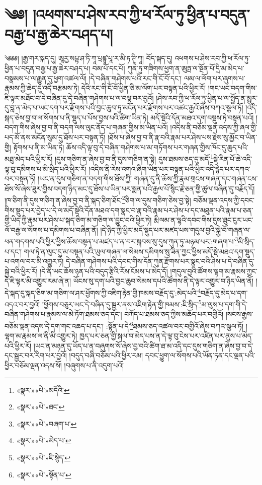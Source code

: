 \chapter{༄༅། །འཕགས་པ་ཤེས་རབ་ཀྱི་ཕ་རོལ་ཏུ་ཕྱིན་པ་བདུན་བརྒྱ་པ་རྒྱ་ཆེར་བཤད་པ།}༄༅༅། །རྒྱ་གར་སྐད་དུ། ཨཱརྱ་སཔྟ་ཤ་ཏི་ཀཱ་པྲཛྙཱ་པཱ་ར་མི་ཏ་ཊཱི་ཀཱ། བོད་སྐད་དུ། འཕགས་པ་ཤེས་རབ་ཀྱི་ཕ་རོལ་ཏུ་ཕྱིན་པ་བདུན་བརྒྱ་པ་རྒྱ་ཆེར་བཤད་པ། བམ་པོ་དང་པོ། ཀུན་ཏུ་གཟིགས་ཕྱག་ན་ཨུཏྤ་ལ་སྔོན་པོ་དྲི་མ་མེད་པ་བསྣམས་པ་ལ་རྒྱུན་དུ་ཕྱག་འཚལ་ལོ། །དེ་བཞིན་གཤེགས་པའི་རང་གི་ངོ་བོ་དང་། ལམ་ལ་ལོག་པར་ཞུགས་པ་རྣམས་ཀྱི་ཆེད་དུ་འདི་བརྩམས་ཏེ། དེའི་རང་གི་ངོ་བོ་ཕྱིན་ཅི་མ་ལོག་པར་བསྟན་པའི་ཕྱིར་རོ། །གང་ཡང་བདག་གིས་ཇི་ལྟར་མཐོང་བ་དེ་བཞིན་དུ་དེ་བཞིན་གཤེགས་པ་ལ་བལྟ་བར་བྱའོ། །ཤེས་རབ་ཀྱི་ཕ་རོལ་ཏུ་ཕྱིན་པ་ལ་སྤྱོད་ན་མྱུར་དུ་བླ་ན་མེད་པ་ཡང་དག་པར་རྫོགས་པའི་བྱང་ཆུབ་ཏུ་མངོན་པར་རྫོགས་པར་འཚང་རྒྱའོ་ཞེས་བཀའ་སྩལ་ཏོ། །འདི་སྐད་ཅེས་བྱ་བ་ལ་སོགས་པ་ནི་སྡུད་པ་པོས་བྱས་པའི་ཚིག་ཡིན་ཏེ། མདོ་སྡེའི་དོན་མཐའ་དག་བསྡུས་ཏེ་བསྟན་པའོ། །བདག་གིས་ཞེས་བྱ་བ་ནི་བདག་ལས་ལུང་ནོད་པ་གཞན་གྱིས་མ་ཡིན་པའོ། །འདིས་ནི་བཅོམ་ལྡན་འདས་ཀྱི་ཞལ་གྱི་པད་མོ་ནས་མངོན་སུམ་དུ་ཐོས་པར་བསྟན་ཏོ། །ཐོས་པ་ཞེས་བྱ་བ་ནི་རྣ་བའི་རྣམ་པར་ཤེས་པས་རྗེས་སུ་མྱོང་བ་ཡིན་གྱི། རྟོགས་པ་ནི་མ་ཡིན་ཏེ། ཆོས་འདི་ལྟ་བུ་དེ་བཞིན་གཤེགས་པ་མ་གཏོགས་པར་གཞན་གྱིས་ཁོང་དུ་ཆུད་པའི་མཐུ་མེད་པའི་ཕྱིར་རོ། །དུས་གཅིག་ན་ཞེས་བྱ་བ་ནི་དུས་གཅིག་ན་སྟེ། དུས་ཐམས་ཅད་དུ་མདོ་\footnote{«སྣར་»«པེ་»མདོའི་}སྡེ་རིན་པོ་ཆེ་འདི་ལྟ་བུ་དམིགས་པ་མི་སྲིད་པའི་ཕྱིར་རོ། །འདིས་ནི་རེས་འགའ་ཞིག་ཡིན་པར་བསྟན་པའི་ཕྱིར་འདི་རྙེད་པར་དཀའ་བར་བསྟན་ཏོ། །ཡང་ན་དུས་གཅིག་ན་བདག་གིས་ཐོས་ཀྱི། གཞན་དུ་ནི་ཆོས་ཀྱི་རྣམ་གྲངས་གཞན་དང་གཞན་ངས་ཐོས་སོ་ཞེས་ཟུར་གྱིས་བདག་ཉིད་མང་དུ་ཐོས་པ་ཡིན་པར་སྨན་པའི་རྒྱལ་པོ་སྙིང་རྗེ་ཅན་གྱི་ཚུལ་བཞིན་དུ་བརྗོད་དོ། །ཁ་ཅིག་ནི་དུས་གཅིག་ན་ཞེས་བྱ་བ་ནི་སྐད་ཅིག་ཐོང་\footnote{«སྣར་»«པེ་»ཐང་}ཅིག་ལ་དུས་གཅིག་ཅེས་བྱ་སྟེ། བཅོམ་ལྡན་འདས་ཀྱི་དབང་གིས་སྡུད་པར་བྱེད་པ་དེ་ལ་མདོ་སྡེའི་དོན་མཐའ་དག་སྣང་བ་རྣ་བའི་རྣམ་པར་ཤེས་པ་དང་མཐུན་པའི་རྣམ་པ་ཅན་གྱི་ཡིད་ཀྱི་རྣམ་པར་ཤེས་པ་སྐད་ཅིག་མ་གཅིག་ལ་བྱུང་བའི་ཕྱིར་ཏེ། རྨི་ལམ་ན་ལྷའི་དབང་གིས་དུས་ཐུང་ངུར་ཡང་ལོ་བརྒྱ་ལ་སོགས་པ་དམིགས་པ་བཞིན་ནོ། །དེ་ཉིད་ཀྱི་ཕྱིར་མདོ་སྡུད་པར་མཛད་པས་གདུལ་བྱའི་སྐྱེ་བོ་གཞན་ལ་ཕན་གདགས་པའི་ཕྱིར་ཕྱིས་ཆོས་བསྟན་པ་མཛད་པ་ན་བར་སྐབས་སུ་དུས་ཀུན་ཏུ་མཉམ་པར་:གཞག་པ་\footnote{«སྣར་»«པེ་»བཞག་པ་}མི་སྲིད་པ་དང་། གལ་ཏེ་ན་ལུང་དུ་མ་བསྟན་པའི་ཡུལ་གཞན་ལ་སེམས་དམིགས་སུ་ཟིན་ཀྱང་ཕྱིས་མདོ་སྡེ་མཐའ་དག་སྡུད་པ་འགལ་བར་མི་འགྱུར་ཏེ། དེ་བཞིན་གཤེགས་པའི་དབང་གིས་དོན་ཀུན་རྫོགས་པར་སྣང་བའི་ཤེས་པ་དེ་བཞིན་དུ་སྐྱེ་བའི་ཕྱིར་རོ། །དེ་ནི་ཡང་ཆོས་ཉན་པའི་བདུད་རྩིའི་རོས་ངོམས་པ་མེད་དོ། །གདུལ་བྱའི་ཚོགས་ལྷག་མ་རྣམས་ཀྱང་དེ་ཇི་ལྟར་མི་འགྱུར་རམ་ཞེ་ན། ཡོངས་སུ་དག་པའི་བྱང་ཆུབ་སེམས་དཔའི་ཚོགས་ནི་དེ་ལྟར་འགྱུར་བ་ཉིད་ཡིན་ནོ། །དེ་སྐད་དུ་སྐད་ཅིག་མ་གཅིག་ལ་ཤར་ཕྱོགས་ཀྱི་འཇིག་རྟེན་གྱི་ཁམས་བརྗོད་དུ་:མེད་པའི་\footnote{«སྣར་»«པེ་»མེད་པ་}བརྗོད་དུ་མེད་པ་དག་འདའ་བར་བྱའོ། །ཕྱོགས་བཅུར་ཡང་དེ་བཞིན་དུ་སྦྱར་ནས་འཇིག་རྟེན་གྱི་ཁམས་:ཇི་སྲིད་\footnote{«སྣར་»«པེ་»ཇི་སྙེད་}མ་ལུས་པ་དག་གི་དེ་བཞིན་གཤེགས་པ་རྣམས་ལ་མེ་ཏོག་ཐམས་ཅད་དང་། བཀོད་པ་ཐམས་ཅད་ཀྱིས་མཆོད་པར་བགྱིའོ། །སངས་རྒྱས་བཅོམ་ལྡན་འདས་དེ་དག་གང་འཆད་པ་དང་། :སྟོན་པ་དེ་\footnote{«སྣར་»«པེ་»སྟོན་པ་}ཐམས་ཅད་འཚལ་བར་བགྱིའོ་ཞེས་བཀའ་སྩལ་ཏོ། །ལྷག་མ་རྣམས་ལ་ནི་མི་འགྱུར་ཏེ། ཁྱད་པར་ཅན་གྱི་སྐལ་བ་མེད་པས་ན་དེ་ལྟ་བུ་ངེས་པར་འཛིན་པར་ནུས་པ་མེད་པའི་ཕྱིར་རོ། །ཡང་ན་མཉན་དུ་ཡོད་པ་ན་བཞུགས་སོ་ཞེས་བྱ་བའི་ཚིག་ཐ་མ་འདི་དང་དུས་གཅིག་ན་ཞེས་བྱ་བ་དེ་དང་སྦྱར་བར་རིག་པར་བྱའོ། །བདུད་བཞི་བཅོམ་པའི་ཕྱིར་རམ། དབང་ཕྱུག་ལ་སོགས་པའི་ཡོན་ཏན་དང་ལྡན་པའི་ཕྱིར་བཅོམ་ལྡན་འདས་སོ། །བཞུགས་པ་ནི་འདུག་པའོ། 